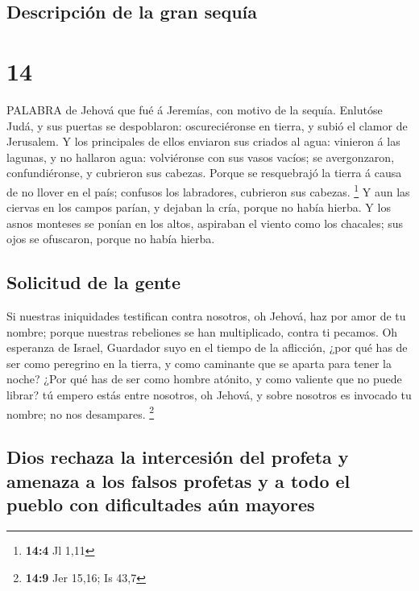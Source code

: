 \hypertarget{descripciuxf3n-de-la-gran-sequuxeda}{%
\subsection{Descripción de la gran
sequía}\label{descripciuxf3n-de-la-gran-sequuxeda}}

\hypertarget{section-13}{%
\section{14}\label{section-13}}

 PALABRA de Jehová que fué á Jeremías, con motivo de la
sequía.  Enlutóse Judá, y sus puertas se despoblaron:
oscureciéronse en tierra, y subió el clamor de Jerusalem.  Y
los principales de ellos enviaron sus criados al agua: vinieron á las
lagunas, y no hallaron agua: volviéronse con sus vasos vacíos; se
avergonzaron, confundiéronse, y cubrieron sus cabezas. 
Porque se resquebrajó la tierra á causa de no llover en el país;
confusos los labradores, cubrieron sus cabezas. \footnote{\textbf{14:4}
  Jl 1,11}  Y aun las ciervas en los campos parían, y
dejaban la cría, porque no había hierba.  Y los asnos
monteses se ponían en los altos, aspiraban el viento como los chacales;
sus ojos se ofuscaron, porque no había hierba.

\hypertarget{solicitud-de-la-gente}{%
\subsection{Solicitud de la gente}\label{solicitud-de-la-gente}}

 Si nuestras iniquidades testifican contra nosotros, oh
Jehová, haz por amor de tu nombre; porque nuestras rebeliones se han
multiplicado, contra ti pecamos.  Oh esperanza de Israel,
Guardador suyo en el tiempo de la aflicción, ¿por qué has de ser como
peregrino en la tierra, y como caminante que se aparta para tener la
noche?  ¿Por qué has de ser como hombre atónito, y como
valiente que no puede librar? tú empero estás entre nosotros, oh Jehová,
y sobre nosotros es invocado tu nombre; no nos desampares. \footnote{\textbf{14:9}
  Jer 15,16; Is 43,7}

\hypertarget{dios-rechaza-la-intercesiuxf3n-del-profeta-y-amenaza-a-los-falsos-profetas-y-a-todo-el-pueblo-con-dificultades-auxfan-mayores}{%
\subsection{Dios rechaza la intercesión del profeta y amenaza a los
falsos profetas y a todo el pueblo con dificultades aún
mayores}\label{dios-rechaza-la-intercesiuxf3n-del-profeta-y-amenaza-a-los-falsos-profetas-y-a-todo-el-pueblo-con-dificultades-auxfan-mayores}}


